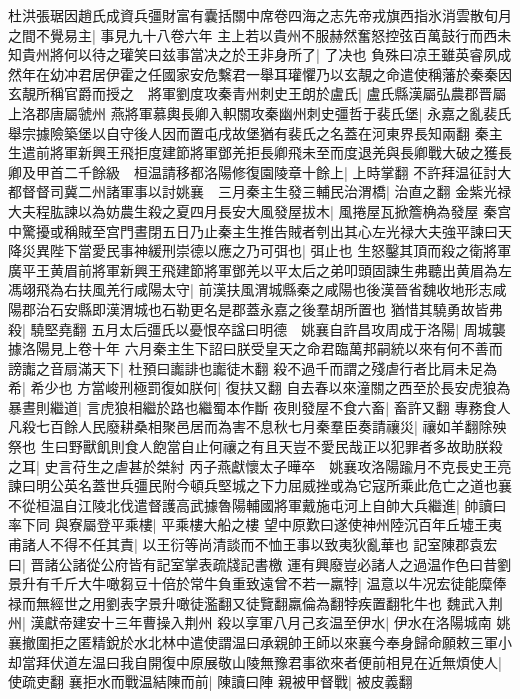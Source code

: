 杜洪張琚因趙氏成資兵彊財富有囊括關中席卷四海之志先帝戎旗西指氷消雲散旬月之間不覺易主|{
	事見九十八卷六年}
主上若以貴州不服赫然奮怒控弦百萬鼓行而西未知貴州將何以待之瓘笑曰兹事當决之於王非身所了|{
	了决也}
負殊曰凉王雖英睿夙成然年在幼冲君居伊霍之任國家安危繫君一舉耳瓘懼乃以玄靚之命遣使稱藩於秦秦因玄靚所稱官爵而授之　將軍劉度攻秦青州刺史王朗於盧氏|{
	盧氏縣漢屬弘農郡晋屬上洛郡唐屬虢州}
燕將軍慕輿長卿入軹關攻秦幽州刺史彊哲于裴氏堡|{
	永嘉之亂裴氏舉宗據險築堡以自守後人因而置屯戌故堡猶有裴氏之名蓋在河東界長知兩翻}
秦主生遣前將軍新興王飛拒度建節將軍鄧羌拒長卿飛未至而度退羌與長卿戰大破之獲長卿及甲首二千餘級　桓温請移都洛陽修復園陵章十餘上|{
	上時掌翻}
不許拜温征討大都督督司冀二州諸軍事以討姚襄　三月秦主生發三輔民治渭橋|{
	治直之翻}
金紫光禄大夫程肱諫以為妨農生殺之夏四月長安大風發屋拔木|{
	風捲屋瓦掀簷桷為發屋}
秦宫中驚擾或稱賊至宫門晝閉五日乃止秦主生推告賊者刳出其心左光禄大夫強平諫曰天降災異陛下當愛民事神緩刑崇德以應之乃可弭也|{
	弭止也}
生怒鑿其頂而殺之衛將軍廣平王黄眉前將軍新興王飛建節將軍鄧羌以平太后之弟叩頭固諫生弗聽出黄眉為左馮翊飛為右扶風羌行咸陽太守|{
	前漢扶風渭城縣秦之咸陽也後漢晉省魏收地形志咸陽郡治石安縣即漢渭城也石勒更名是郡蓋永嘉之後羣胡所置也}
猶惜其驍勇故皆弗殺|{
	驍堅堯翻}
五月太后彊氏以憂恨卒諡曰明德　姚襄自許昌攻周成于洛陽|{
	周城襲據洛陽見上卷十年}
六月秦主生下詔曰朕受皇天之命君臨萬邦嗣統以來有何不善而謗讟之音扇滿天下|{
	杜預曰讟誹也讟徒木翻}
殺不過千而謂之殘虐行者比肩未足為希|{
	希少也}
方當峻刑極罰復如朕何|{
	復扶又翻}
自去春以來潼關之西至於長安虎狼為暴晝則繼道|{
	言虎狼相繼於路也繼蜀本作斷}
夜則發屋不食六畜|{
	畜許又翻}
專務食人凡殺七百餘人民廢耕桑相聚邑居而為害不息秋七月秦羣臣奏請禳災|{
	禳如羊翻除殃祭也}
生曰野獸飢則食人飽當自止何禳之有且天豈不愛民哉正以犯罪者多故助朕殺之耳|{
	史言苻生之虐甚於桀紂}
丙子燕獻懷太子曄卒　姚襄攻洛陽踰月不克長史王亮諫曰明公英名蓋世兵彊民附今頓兵堅城之下力屈威挫或為它寇所乘此危亡之道也襄不從桓温自江陵北伐遣督護高武據魯陽輔國將軍戴施屯河上自帥大兵繼進|{
	帥讀曰率下同}
與寮屬登平乘樓|{
	平乘樓大船之樓}
望中原歎曰遂使神州陸沉百年丘墟王夷甫諸人不得不任其責|{
	以王衍等尚清談而不恤王事以致夷狄亂華也}
記室陳郡袁宏曰|{
	晋諸公諸從公府皆有記室掌表疏牋記書檄}
運有興廢豈必諸人之過温作色曰昔劉景升有千斤大牛噉芻豆十倍於常牛負重致遠曾不若一羸㹀|{
	温意以牛况宏徒能糜俸禄而無經世之用劉表字景升噉徒濫翻又徒覽翻羸倫為翻㹀疾置翻牝牛也}
魏武入荆州|{
	漢獻帝建安十三年曹操入荆州}
殺以享軍八月己亥温至伊水|{
	伊水在洛陽城南}
姚襄撤圍拒之匿精銳於水北林中遣使謂温曰承親帥王師以來襄今奉身歸命願敕三軍小却當拜伏道左温曰我自開復中原展敬山陵無豫君事欲來者便前相見在近無煩使人|{
	使疏吏翻}
襄拒水而戰温結陳而前|{
	陳讀曰陣}
親被甲督戰|{
	被皮義翻}

